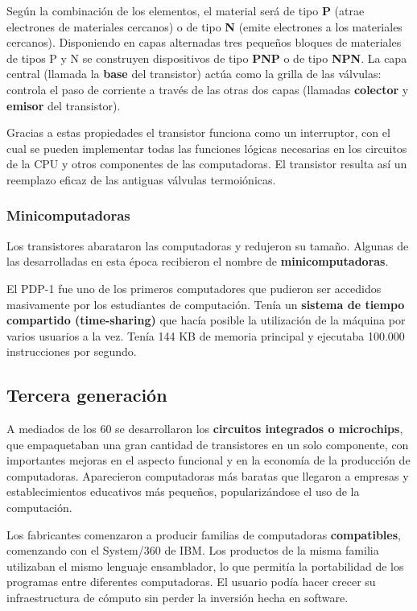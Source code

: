 \documentclass[spanish,A4,]{article}
\begin{document}
Según la combinación de los elementos, el material será de tipo
\textbf{P} (atrae electrones de materiales cercanos) o de tipo
\textbf{N} (emite electrones a los materiales cercanos). Disponiendo en
capas alternadas tres pequeños bloques de materiales de tipos P y N se
construyen dispositivos de tipo \textbf{PNP} o de tipo \textbf{NPN}. La
capa central (llamada la \textbf{base} del transistor) actúa como la
grilla de las válvulas: controla el paso de corriente a través de las
otras dos capas (llamadas \textbf{colector} y \textbf{emisor} del
transistor).

Gracias a estas propiedades el transistor funciona como un interruptor,
con el cual se pueden implementar todas las funciones lógicas necesarias
en los circuitos de la CPU y otros componentes de las computadoras. El
transistor resulta así un reemplazo eficaz de las antiguas válvulas
termoiónicas.

\subsubsection{Minicomputadoras}\label{minicomputadoras}

Los transistores abarataron las computadoras y redujeron su tamaño.
Algunas de las desarrolladas en esta época recibieron el nombre de
\textbf{minicomputadoras}.

El PDP-1 fue uno de los primeros computadores que pudieron ser accedidos
masivamente por los estudiantes de computación. Tenía un \textbf{sistema
de tiempo compartido (time-sharing)} que hacía posible la utilización de
la máquina por varios usuarios a la vez. Tenía 144 KB de memoria
principal y ejecutaba 100.000 instrucciones por segundo.

\subsection{Tercera generación}\label{tercera-generaciuxf3n}

A mediados de los 60 se desarrollaron los \textbf{circuitos integrados o
microchips}, que empaquetaban una gran cantidad de transistores en un
solo componente, con importantes mejoras en el aspecto funcional y en la
economía de la producción de computadoras. Aparecieron computadoras más
baratas que llegaron a empresas y establecimientos educativos más
pequeños, popularizándose el uso de la computación.

Los fabricantes comenzaron a producir familias de computadoras
\textbf{compatibles}, comenzando con el System/360 de IBM. Los productos
de la misma familia utilizaban el mismo lenguaje ensamblador, lo que
permitía la portabilidad de los programas entre diferentes computadoras.
El usuario podía hacer crecer su infraestructura de cómputo sin perder
la inversión hecha en software.
\end{document}
